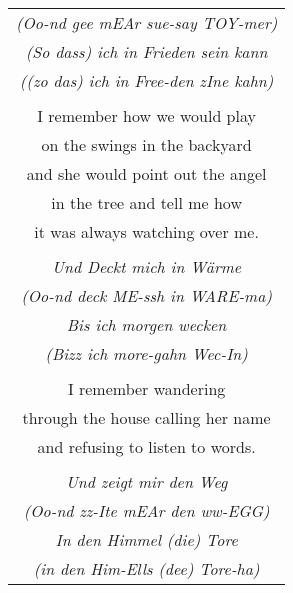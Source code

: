 \documentclass{article}
\begin{document}
\begin{center}
\begin{tabular}{c}
{\scriptsize\textit{(Oo-nd gee mEAr sue-say TOY-mer)}} \\
\textit{(So dass) ich in Frieden sein kann} \\
{\scriptsize\textit{((zo das) ich in Free-den zIne kahn)}} \\
\\
I remember how we would play \\
on the swings in the backyard \\
and she would point out the angel \\
in the tree and tell me how \\
it was always watching over me. \\
\\
\textit{Und Deckt mich in W{\"a}rme} \\
{\scriptsize\textit{(Oo-nd deck ME-ssh in WARE-ma)}} \\
\textit{Bis ich morgen wecken} \\
{\scriptsize\textit{(Bizz ich more-gahn Wec-In)}} \\
\\
I remember wandering \\
through the house calling her name \\
and refusing to listen to words. \\
\\
\textit{Und zeigt mir den Weg} \\
{\scriptsize\textit{(Oo-nd zz-Ite mEAr den ww-EGG)}} \\
\textit{In den Himmel (die) Tore} \\
{\scriptsize\textit{(in den Him-Ells (dee) Tore-ha)}} \\

\end{tabular}
\end{center}
\end{document}
